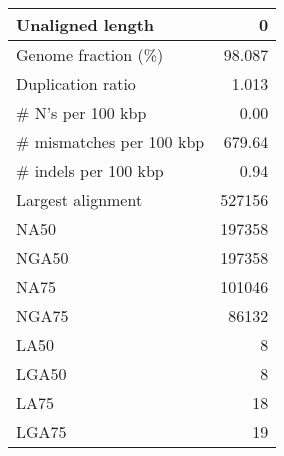 \documentclass[12pt,a4paper]{article}
\begin{document}
\begin{table}[ht]
\begin{center}
\begin{tabular}{|l*{1}{|r}|}
Unaligned length & 0 \\ \hline
Genome fraction (\%) & 98.087 \\ \hline
Duplication ratio & 1.013 \\ \hline
\# N's per 100 kbp & 0.00 \\ \hline
\# mismatches per 100 kbp & 679.64 \\ \hline
\# indels per 100 kbp & 0.94 \\ \hline
Largest alignment & 527156 \\ \hline
NA50 & 197358 \\ \hline
NGA50 & 197358 \\ \hline
NA75 & 101046 \\ \hline
NGA75 & 86132 \\ \hline
LA50 & 8 \\ \hline
LGA50 & 8 \\ \hline
LA75 & 18 \\ \hline
LGA75 & 19 \\ \hline
\end{tabular}
\end{center}
\end{table}
\end{document}
